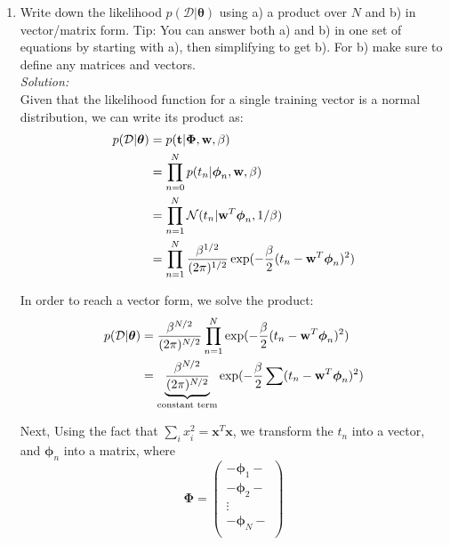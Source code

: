 \documentclass[12pt,a4paper]{article}
\newcommand{\Data}{\mathcal{D}}
\newcommand{\DataIndex}{n}
\newcommand{\tscalar}{t}
\newcommand{\tvec}{{\bf \tscalar}}
\newcommand{\wscalar}{w}
\newcommand{\wvec}{{\bf \wscalar}}
\newcommand{\tn}{\tscalar_{\DataIndex}}
\newcommand{\thetavec}{\boldsymbol{\theta}}
\newcommand{\thetav}{\thetavec}
\newcommand{\phivec}{\boldsymbol{\phi}}
\newcommand{\Phimat}{\boldsymbol{\Phi}}
\newcommand{\phivecn}{\phivec_{\DataIndex}}
\begin{document}
\begin{enumerate}
  \item Write down the likelihood $p(\Data | \thetav)$ using a) a product over $N$ and b) in vector/matrix form.    Tip: You can answer both a) and b) in one set of equations by starting with a), then simplifying to get b).  For b) make sure to define any matrices and vectors. \\
	  \emph{Solution:} \\
		  Given that the likelihood function for a single training vector is a normal distribution, we can write its product as: \\
		  
		  \begin{align*}
		  p(\Data | \thetav) &= p(\tvec | \Phimat, \wvec, \beta) \\
		  &= \prod_{n = 0}^N p(\tn | \phivecn, \wvec, \beta) \\
		  &= \prod_{n=1}^{N} \mathcal{N}(\tn| \wvec^T \phivecn, 1 / \beta) \\
		  &=  \prod_{n=1}^{N} \frac{\beta^{1/2}}{(2\pi)^{1/2}} \exp (-\frac{\beta}{2}(\tn- \wvec^T \phivecn)^2)\\
		  \end{align*}
		  
		  In order to reach a vector form, we solve the product: \\
		  
		  \begin{align*}         
		  p(\Data | \thetav) &=  \frac{\beta^{N/2}}{(2\pi)^{N/2}} \prod_{n=1}^{N} \exp (-\frac{\beta}{2}(\tn- \wvec^T \phivecn)^2)\\    
		  &=  \underbrace{\frac{\beta^{N/2}}{(2\pi)^{N/2}}}_{\text{constant term}} \exp (-\frac{\beta}{2}\sum(\tn - \wvec^T \phivecn)^2)\\ 
		  \end{align*}
		  
		  Next, Using the fact that $\sum_i x_i^2 = \mathbf{x}^T\mathbf{x}$, we transform the $\tn$ into a vector, and $\phivecn$ into a matrix, where \\
		  
		  \begin{equation*}
		  \Phimat = 
		  \begin{pmatrix}
		  - \phivec_1 - \\
		  - \phivec_2 - \\
		  \vdots  \\
		  - \phivec_N -\\
		  \end{pmatrix}
		  \end{equation*}
		  

\end{enumerate}
\end{document}
